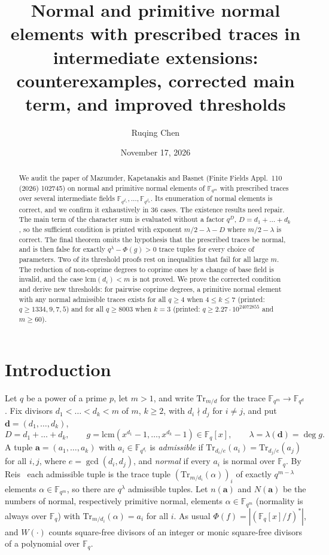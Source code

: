 \documentclass[11pt,a4paper]{amsart}
\title[Prescribed traces in intermediate extensions: an audit]{\textbf{Normal and primitive normal elements
with prescribed traces in intermediate extensions: counterexamples, corrected main term, and
improved thresholds}}
\author{Ruqing Chen}
\date{November 17, 2026}
\theoremstyle{remark}
\newcommand{\F}{\mathbb{F}}
\newcommand{\Fq}{\mathbb{F}_q}
\newcommand{\Tr}{\mathrm{Tr}}
\newcommand{\lcm}{\mathrm{lcm}}
\newcommand{\bd}{\mathbf{d}}
\newcommand{\ba}{\mathbf{a}}
\begin{document}
\begin{abstract}
We audit the paper of Mazumder, Kapetanakis and Basnet (Finite Fields Appl.\ 110 (2026) 102745) on normal and
primitive normal elements of $\F_{q^m}$ with prescribed traces over several intermediate fields
$\F_{q^{d_1}},\dots,\F_{q^{d_k}}$. Its enumeration of normal elements is correct, and we confirm it exhaustively
in $36$ cases. The existence results need repair. The main term of the character sum is evaluated without a
factor $q^{D}$, $D=d_1+\dots+d_k$, so the sufficient condition is printed with exponent $m/2-\lambda-D$ where
$m/2-\lambda$ is correct. The final theorem omits the hypothesis that the prescribed traces be normal, and is
then false for exactly $q^{\lambda}-\Phi(g)>0$ trace tuples for every choice of parameters. Two of its
threshold proofs rest on inequalities that fail for all large $m$. The reduction of non-coprime degrees to
coprime ones by a change of base field is invalid, and the case $\lcm(d_i)<m$ is not proved. We prove the
corrected condition and derive new thresholds: for pairwise coprime degrees, a primitive normal element with
any normal admissible traces exists for all $q\ge4$ when $4\le k\le7$ (printed: $q\ge1334,9,7,5$) and for
all $q\ge8003$ when $k=3$ (printed: $q\ge2.27\cdot10^{24072855}$ and $m\ge60$).
\end{abstract}
\maketitle

\section{Introduction}

Let $q$ be a power of a prime $p$, let $m>1$, and write $\Tr_{m/d}$ for the trace
$\F_{q^m}\to\F_{q^d}$. Fix divisors $d_1<\dots<d_k<m$ of $m$, $k\ge2$, with $d_i\nmid d_j$ for $i\ne j$, and
put $\bd=(d_1,\dots,d_k)$,
\[
D=d_1+\dots+d_k,\qquad g=\lcm(x^{d_1}-1,\dots,x^{d_k}-1)\in\Fq[x],\qquad\lambda=\lambda(\bd)=\deg g .
\]
A tuple $\ba=(a_1,\dots,a_k)$ with $a_i\in\F_{q^{d_i}}$ is \emph{admissible} if
$\Tr_{d_i/e}(a_i)=\Tr_{d_j/e}(a_j)$ for all $i,j$, where $e=\gcd(d_i,d_j)$, and \emph{normal} if every $a_i$
is normal over $\Fq$. By Reis~\cite{Reis} each admissible tuple is the trace tuple
$(\Tr_{m/d_i}(\alpha))_i$ of exactly $q^{m-\lambda}$ elements $\alpha\in\F_{q^m}$, so there are $q^{\lambda}$
admissible tuples. Let $n(\ba)$ and $N(\ba)$ be the numbers of normal, respectively primitive normal,
elements $\alpha\in\F_{q^m}$ (normality is always over $\Fq$) with $\Tr_{m/d_i}(\alpha)=a_i$ for all $i$. As
usual $\Phi(f)=|(\Fq[x]/f)^*|$, and $W(\cdot)$ counts square-free divisors of an integer or monic square-free
divisors of a polynomial over $\Fq$.
\end{document}
